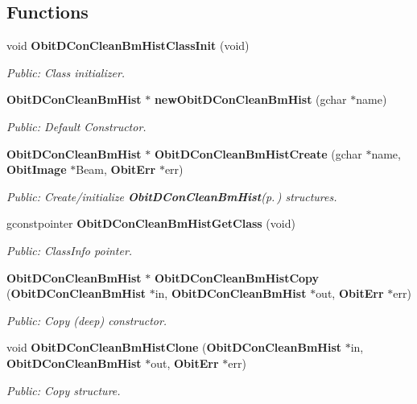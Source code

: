 \subsection*{Functions}
\begin{CompactItemize}
\item 
void {\bf Obit\-DCon\-Clean\-Bm\-Hist\-Class\-Init} (void)
\begin{CompactList}\small\item\em Public: Class initializer. \item\end{CompactList}\item 
{\bf Obit\-DCon\-Clean\-Bm\-Hist} $\ast$ {\bf new\-Obit\-DCon\-Clean\-Bm\-Hist} (gchar $\ast$name)
\begin{CompactList}\small\item\em Public: Default Constructor. \item\end{CompactList}\item 
{\bf Obit\-DCon\-Clean\-Bm\-Hist} $\ast$ {\bf Obit\-DCon\-Clean\-Bm\-Hist\-Create} (gchar $\ast$name, {\bf Obit\-Image} $\ast$Beam, {\bf Obit\-Err} $\ast$err)
\begin{CompactList}\small\item\em Public: Create/initialize {\bf Obit\-DCon\-Clean\-Bm\-Hist}{\rm (p.\,\pageref{structObitDConCleanBmHist})} structures. \item\end{CompactList}\item 
gconstpointer {\bf Obit\-DCon\-Clean\-Bm\-Hist\-Get\-Class} (void)
\begin{CompactList}\small\item\em Public: Class\-Info pointer. \item\end{CompactList}\item 
{\bf Obit\-DCon\-Clean\-Bm\-Hist} $\ast$ {\bf Obit\-DCon\-Clean\-Bm\-Hist\-Copy} ({\bf Obit\-DCon\-Clean\-Bm\-Hist} $\ast$in, {\bf Obit\-DCon\-Clean\-Bm\-Hist} $\ast$out, {\bf Obit\-Err} $\ast$err)
\begin{CompactList}\small\item\em Public: Copy (deep) constructor. \item\end{CompactList}\item 
void {\bf Obit\-DCon\-Clean\-Bm\-Hist\-Clone} ({\bf Obit\-DCon\-Clean\-Bm\-Hist} $\ast$in, {\bf Obit\-DCon\-Clean\-Bm\-Hist} $\ast$out, {\bf Obit\-Err} $\ast$err)
\begin{CompactList}\small\item\em Public: Copy structure. \item\end{CompactList}\item 

\end{CompactItemize}
